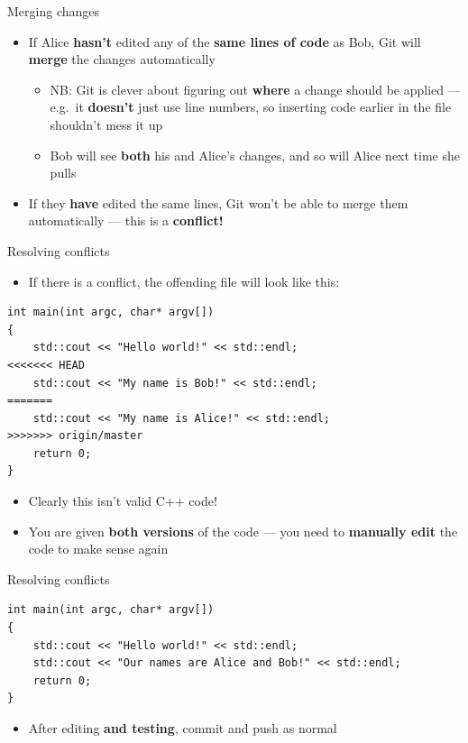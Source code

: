 \begin{frame}{Merging changes}
    \begin{itemize}
        \item If Alice \textbf{hasn't} edited any of the \textbf{same lines of code} as Bob,
            Git will \textbf{merge} the changes automatically \pause
            \begin{itemize}
                \item NB: Git is clever about figuring out \textbf{where} a change should be applied ---
                    e.g.\ it \textbf{doesn't} just use line numbers,
                    so inserting code earlier in the file shouldn't mess it up \pause
                \item Bob will see \textbf{both} his and Alice's changes, and so will Alice next time she pulls
                    \pause
            \end{itemize}
        \item If they \textbf{have} edited the same lines, Git won't be able to merge them automatically
            --- this is a \textbf{conflict!}
    \end{itemize}
\end{frame}

\begin{frame}[fragile]{Resolving conflicts}
    \begin{itemize}
        \item If there is a conflict, the offending file will look like this:
    \end{itemize}
    \begin{lstlisting}
int main(int argc, char* argv[])
{
    std::cout << "Hello world!" << std::endl;
<<<<<<< HEAD
    std::cout << "My name is Bob!" << std::endl;
=======
    std::cout << "My name is Alice!" << std::endl;
>>>>>>> origin/master
    return 0;
}
    \end{lstlisting}
    \pause
    \begin{itemize}
        \item Clearly this isn't valid C++ code! \pause
        \item You are given \textbf{both versions} of the code ---
            you need to \textbf{manually edit} the code to make sense again
    \end{itemize}
\end{frame}

\begin{frame}[fragile]{Resolving conflicts}
    \begin{lstlisting}
int main(int argc, char* argv[])
{
    std::cout << "Hello world!" << std::endl;
    std::cout << "Our names are Alice and Bob!" << std::endl;
    return 0;
}
    \end{lstlisting}
    \pause
    \begin{itemize}
        \item After editing \textbf{and testing}, commit and push as normal
    \end{itemize}
\end{frame}

